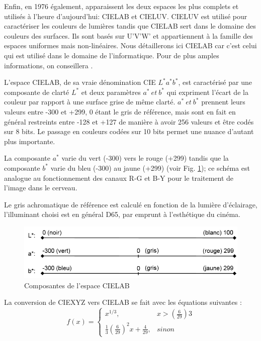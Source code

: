 	\par Enfin, en 1976 également, apparaissent les deux espaces les plus complets et utilisés à l'heure d'aujourd'hui: CIELAB et CIELUV. CIELUV est utilisé pour caractériser les couleurs de lumières tandis que CIELAB sert dans le domaine des couleurs des surfaces. Ils sont basés sur U'V'W' et appartiennent à la famille des espaces uniformes mais non-linéaires. Nous détaillerons ici CIELAB car c'est celui qui est utilisé dans le domaine de l'informatique. Pour de plus amples informations, on conseillera \citep{schanda_colorimetry:_2007}.
	
	\par L'espace CIELAB, de sa vraie dénomination CIE $L^\ast a^\ast b^\ast$, est caractérisé par une composante de clarté $L^\ast$ et deux paramètres $a^\ast~et~b^\ast$ qui expriment l'écart de la couleur par rapport à une surface grise de même clarté.
	$a^\ast~et~b^\ast$ prennent leurs valeurs entre -300 et +299, 0 étant le gris de référence, mais sont en fait en général restreints entre -128 et +127 de manière à avoir 256 valeurs et être codés sur 8 bits. Le passage en couleurs codées sur 10 bits permet une nuance d'autant plus importante.
	
	\par La composante $a^\ast$ varie du vert (-300) vers le rouge (+299) tandis que la composante $b^\ast$ varie du bleu (-300) au jaune (+299) (voir Fig. \ref{fig:cielab_axes}); ce schéma est analogue au fonctionnement des canaux R-G et B-Y pour le traitement de l'image dans le cerveau.
	
	\par Le gris achromatique de référence est calculé en fonction de la lumière d'éclairage, l'illuminant choisi est en général D65, par emprunt à l'esthétique du cinéma.
	
	\begin{figure}
		\centering
		\includegraphics[scale=1]{Figures/CIELABAxes}
		\caption{Composantes de l'espace CIELAB}
		\label{fig:cielab_axes}
	\end{figure}
	
	\par La conversion de CIEXYZ vers CIELAB se fait avec les équations suivantes \citep{robertson_historical_1990}:
	\begin{equation}
		f(x)=  \begin{cases}
		x^{1/3}, & x>\left(\frac{6}{29}\right)3\\
		\frac{1}{3}\left(\frac{6}{29}\right)^2x + \frac{4}{29}, & sinon
		\end{cases}
		\label{eq:xyz_to_lab}
	\end{equation}
	
